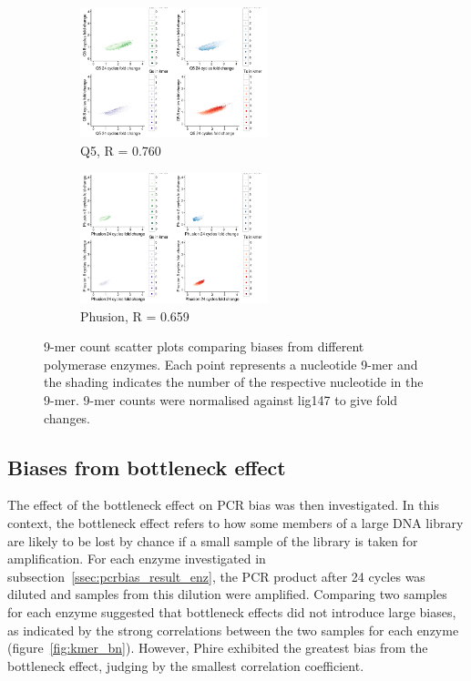 \documentclass[parskip=full, numbers=noenddot]{scrbook}
\begin{document}
\begin{figure}[htb]
\begin{subfigure}[htb]{0.6\textwidth}
    \centering
    \includegraphics[width=0.6\textwidth]{kmer_q5}
    \caption{Q5, R = 0.760}
    \label{fig:kmer_enz_q5}
  \end{subfigure}
  \begin{subfigure}[htb]{0.6\textwidth}
    \centering
    \includegraphics[width=0.6\textwidth]{kmer_phusion}
    \caption{Phusion, R = 0.659}
    \label{fig:kmer_enz_phusion}
  \end{subfigure}
  \caption{9-mer count scatter plots comparing biases from different polymerase enzymes.  Each point represents a nucleotide 9-mer and the shading indicates the number of the respective nucleotide in the 9-mer.  9-mer counts were normalised against lig147 to give fold changes.}
  \label{fig:kmer_enz}
\end{figure}

\subsection{Biases from bottleneck effect}
\label{ssec:pcrbias_result_bn}

The effect of the bottleneck effect on PCR bias was then investigated.  In this context, the bottleneck effect refers to how some members of a large DNA library are likely to be lost by chance if a small sample of the library is taken for amplification.  For each enzyme investigated in subsection~\ref{ssec:pcrbias_result_enz}, the PCR product after 24 cycles was diluted and samples from this dilution were amplified.  Comparing two samples for each enzyme suggested that bottleneck effects did not introduce large biases, as indicated by the strong correlations between the two samples for each enzyme (figure~\ref{fig:kmer_bn}).  However, Phire exhibited the greatest bias from the bottleneck effect, judging by the smallest correlation coefficient.
\end{document}
